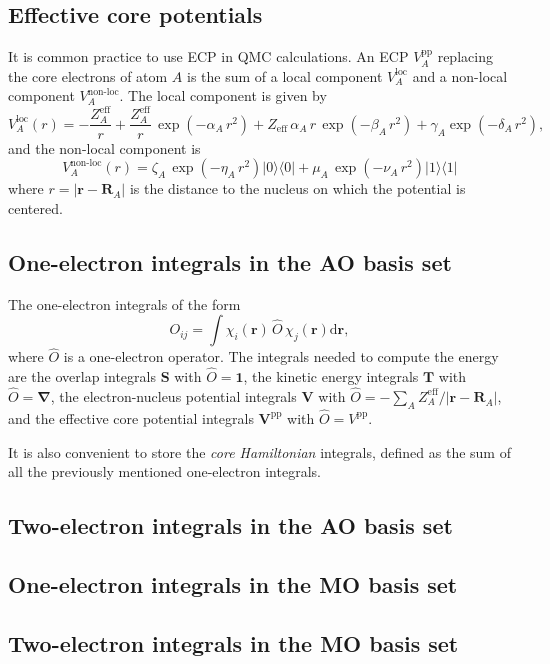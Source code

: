 \subsection{Effective core potentials}
It is common practice to use \ac{ECP} in \ac{QMC} calculations.  An
\ac{ECP} $V_A^{\text{pp}}$ replacing the core electrons of atom $A$ is
the sum of a local component $V_A^{\text{loc}}$ and a non-local
component $V_A^{\text{non-loc}}$.\cite{burkatzki_2008}
The local component is given by
\[
  V_A^{\text{loc}}(r) = -\frac{Z_A^{\text{eff}}}{r} +
  \frac{Z_A^{\text{eff}}}{r}\, \exp\left( -\alpha_A\, r^2\right) + 
  Z_{\text{eff}}\, \alpha_A\, r\, \exp\left( -\beta_A\, r^2\right) + 
  \gamma_A \exp\left( -\delta_A\, r^2\right),
\]
and the non-local component is
\[
  V_A^{\text{non-loc}}(r) =
    \zeta_A\, \exp\left( -\eta_A\, r^2\right) |0\rangle \langle 0| +  
    \mu_A \,  \exp\left( -\nu_A \, r^2\right) |1\rangle \langle 1|
\]
where $r=|\mathbf{r-R}_A|$ is the distance to the nucleus on which the
potential is centered.


\subsection{One-electron integrals in the AO basis set}

The one-electron integrals of the form
\[
  O_{ij} = \int \chi_i(\mathbf{r})\, \hat{O}\, \chi_j(\mathbf{r}) \text{d}\mathbf{r},
\]
where $\hat{O}$ is a one-electron operator. The integrals needed to
compute the energy are the overlap integrals $\mathbf{S}$ with $\hat{O}=\mathbf{1}$,
the kinetic energy integrals $\mathbf{T}$ with $\hat{O}=\mathbf{\nabla}$, the
electron-nucleus potential integrals $\mathbf{V}$ with $\hat{O}=-\sum_A
Z_A^{\text{eff}}/|\mathbf{r-R}_A|$,
and the effective core potential integrals $\mathbf{V}^{\text{pp}}$
with $\hat{O}=V^{\text{pp}}$.

It is also convenient to store the \emph{core Hamiltonian} integrals, defined as
the sum of all the previously mentioned one-electron integrals.

\subsection{Two-electron integrals in the AO basis set}
\subsection{One-electron integrals in the MO basis set}
\subsection{Two-electron integrals in the MO basis set}


